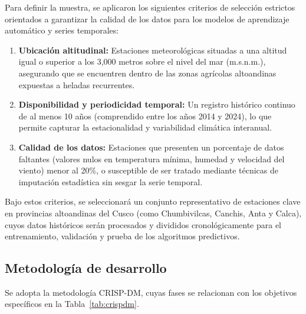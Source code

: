 Para definir la muestra, se aplicaron los siguientes criterios de selección estrictos orientados a garantizar la calidad de los datos para los modelos de aprendizaje automático y series temporales:
\begin{enumerate}
    \item \textbf{Ubicación altitudinal:} Estaciones meteorológicas situadas a una altitud igual o superior a los 3,000 metros sobre el nivel del mar (m.s.n.m.), asegurando que se encuentren dentro de las zonas agrícolas altoandinas expuestas a heladas recurrentes.
    \item \textbf{Disponibilidad y periodicidad temporal:} Un registro histórico continuo de al menos 10 años (comprendido entre los años 2014 y 2024), lo que permite capturar la estacionalidad y variabilidad climática interanual.
    \item \textbf{Calidad de los datos:} Estaciones que presenten un porcentaje de datos faltantes (valores nulos en temperatura mínima, humedad y velocidad del viento) menor al 20\%, o susceptible de ser tratado mediante técnicas de imputación estadística sin sesgar la serie temporal.
\end{enumerate}
Bajo estos criterios, se seleccionará un conjunto representativo de estaciones clave en provincias altoandinas del Cusco (como Chumbivilcas, Canchis, Anta y Calca), cuyos datos históricos serán procesados y divididos cronológicamente para el entrenamiento, validación y prueba de los algoritmos predictivos.
\subsection{Metodología de desarrollo}
Se adopta la metodología CRISP-DM, cuyas fases se relacionan con los objetivos específicos en la Tabla~\ref{tab:crispdm}.

